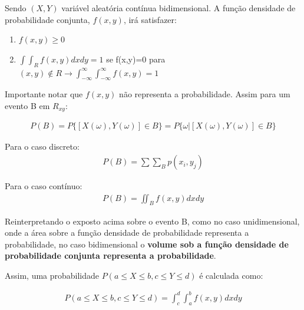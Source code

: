 \documentclass[
  letterpaper,
  DIV=11,
  numbers=noendperiod]{scrreprt}
\begin{document}
\begin{tcolorbox}[enhanced jigsaw, bottomrule=.15mm, colbacktitle=quarto-callout-note-color!10!white, colback=white, toptitle=1mm, colframe=quarto-callout-note-color-frame, breakable, arc=.35mm, opacitybacktitle=0.6, titlerule=0mm, title={DEFINIÇÃO}, left=2mm, bottomtitle=1mm, coltitle=black, rightrule=.15mm, leftrule=.75mm, toprule=.15mm, opacityback=0]

Sendo \((X,Y)\) variável aleatória contínua bidimensional. A função
densidade de probabilidade conjunta, \(f(x,y)\), irá satisfazer:

\begin{enumerate}
\def\labelenumi{\roman{enumi})}
\item
  \(f(x,y) \geq 0\)
\item
  \(\int \int_{R} f(x,y)dxdy= 1\) se f(x,y)=0 para
  \((x,y)\notin R \rightarrow \int_{- \infty}^{\infty}\int_{- \infty}^{\infty} f(x,y)=1\)
\end{enumerate}

\end{tcolorbox}

Importante notar que \(f(x,y)\) não representa a probabilidade. Assim
para um evento B em \(R_{xy}\):

\[\begin{array}{ccc}
P(B)=P\{ [X(\omega),Y(\omega)] \in B \}= P\{\omega | [X(\omega),Y(\omega)] \in B \}
\end{array}\]

Para o caso discreto: \[\begin{array}{ccc}
P(B)=\sum \sum_{B} p(x_{i},y_{j})
\end{array}\]

Para o caso contínuo: \[\begin{array}{ccc}
P(B)=\iint_{B} f(x,y)dxdy
\end{array}\]

Reinterpretando o exposto acima sobre o evento B, como no caso
unidimensional, onde a área sobre a função densidade de probabilidade
representa a probabilidade, no caso bidimensional o \textbf{volume sob a
função densidade de probabilidade conjunta representa a probabilidade}.

Assim, uma probabilidade \(P(a \leq X \leq b, c\leq Y \leq d)\) é
calculada como:

\[\begin{array}{ccc}
 P(a \leq X \leq b, c\leq Y \leq d)  = \int_{c}^{d}\int_{a}^{b} f(x,y)dxdy
\end{array}\]
\end{document}
